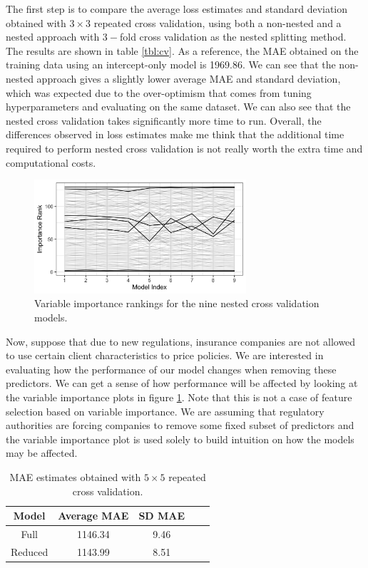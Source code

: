 \documentclass[11pt,a4paper]{article}
\theoremstyle{plain}
\theoremstyle{definition}
\begin{document}
The first step is to compare the average loss estimates and standard deviation obtained with $3\times 3$ repeated cross validation, using both a non-nested and a nested approach with $3-$fold cross validation as the nested splitting method. The results are shown in table \ref{tbl:cv}. As a reference, the MAE obtained on the training data using an intercept-only model is 1969.86. We can see that the non-nested approach gives a slightly lower average MAE and standard deviation, which was expected due to the over-optimism that comes from tuning hyperparameters and evaluating on the same dataset. We can also see that the nested cross validation takes significantly more time to run. Overall, the differences observed in loss estimates make me think that the additional time required to perform nested cross validation is not really worth the extra time and computational costs.

\begin{figure}[ht]
\centering
\includegraphics[width=0.7\textwidth]{importance_notitle.png}
\caption{Variable importance rankings for the nine nested cross validation models.}
\label{fig:example}
\end{figure}

Now, suppose that due to new regulations, insurance companies are not allowed to use certain client characteristics to price policies. We are interested in evaluating how the performance of our model changes when removing these predictors. We can get a sense of how performance will be affected by looking at the variable importance plots in figure \ref{fig:example}. Note that this is not a case of feature selection based on variable importance. We are assuming that regulatory authorities are forcing companies to remove some fixed subset of predictors and the variable importance plot is used solely to build intuition on how the models may be affected.

\begin{table}[ht]
\centering
\begin{tabular}{|c|c|c|c|c|}
\hline
Model & Average MAE & SD MAE\\
\hline
Full & 1146.34 & 9.46\\
Reduced & 1143.99 & 8.51\\
\hline
\end{tabular}
\caption{MAE estimates obtained with $5\times 5$ repeated cross validation.}
\label{tbl:diff}
\end{table}
\end{document}
